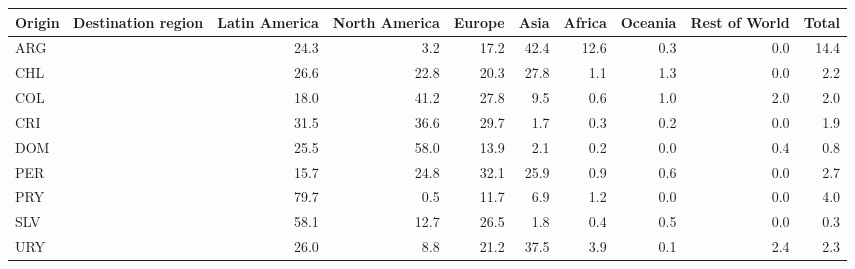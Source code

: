 \begin{tabular}{lrrrrrrrr}
\toprule
Origin \ Destination region & Latin America & North America & Europe & Asia & Africa & Oceania & Rest of World & Total \\
\midrule
ARG & 24.3 & 3.2 & 17.2 & 42.4 & 12.6 & 0.3 & 0.0 & 14.4 \\
CHL & 26.6 & 22.8 & 20.3 & 27.8 & 1.1 & 1.3 & 0.0 & 2.2 \\
COL & 18.0 & 41.2 & 27.8 & 9.5 & 0.6 & 1.0 & 2.0 & 2.0 \\
CRI & 31.5 & 36.6 & 29.7 & 1.7 & 0.3 & 0.2 & 0.0 & 1.9 \\
DOM & 25.5 & 58.0 & 13.9 & 2.1 & 0.2 & 0.0 & 0.4 & 0.8 \\
PER & 15.7 & 24.8 & 32.1 & 25.9 & 0.9 & 0.6 & 0.0 & 2.7 \\
PRY & 79.7 & 0.5 & 11.7 & 6.9 & 1.2 & 0.0 & 0.0 & 4.0 \\
SLV & 58.1 & 12.7 & 26.5 & 1.8 & 0.4 & 0.5 & 0.0 & 0.3 \\
URY & 26.0 & 8.8 & 21.2 & 37.5 & 3.9 & 0.1 & 2.4 & 2.3 \\
\bottomrule
\end{tabular}
